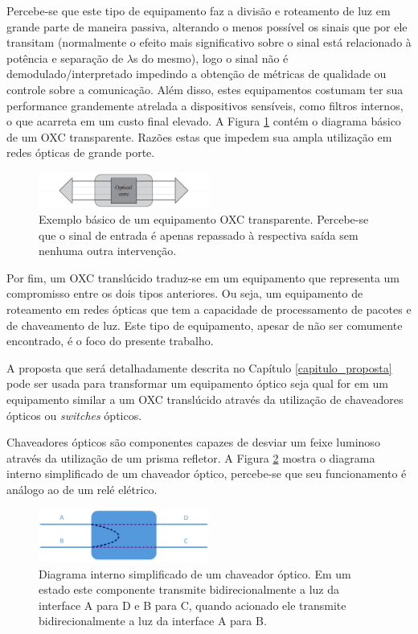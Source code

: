 Percebe-se que este tipo de equipamento faz a divisão e roteamento de luz em grande parte de maneira passiva, alterando o menos possível os sinais que por ele transitam (normalmente o efeito mais significativo sobre o sinal está relacionado à potência e separação de $\lambda$s do mesmo), logo o sinal não é demodulado/interpretado impedindo a obtenção de métricas de qualidade ou controle sobre a comunicação. Além disso, estes equipamentos costumam ter sua performance grandemente atrelada a dispositivos sensíveis, como filtros internos, o que acarreta em um custo final elevado. A Figura \ref{fig_oxc_optico} contém o diagrama básico de um OXC transparente. Razões estas que impedem sua ampla utilização em redes ópticas de grande porte.

\begin{figure}[!htb]
	\centering
	\includegraphics[width=0.5\textwidth]{./figuras/OXC-Optico.png} %
	\caption[Exemplo básico de OXC óptico]{Exemplo básico de um equipamento OXC transparente. Percebe-se que o sinal de entrada é apenas repassado à respectiva saída sem nenhuma outra intervenção.}
	\label{fig_oxc_optico}
\end{figure}

Por fim, um OXC translúcido traduz-se em um equipamento que representa um compromisso entre os dois tipos anteriores. Ou seja, um equipamento de roteamento em redes ópticas que tem a capacidade de processamento de pacotes e de chaveamento de luz. Este tipo de equipamento, apesar de não ser comumente encontrado, é o foco do presente trabalho.

A proposta que será detalhadamente descrita no Capítulo \ref{capitulo_proposta} pode ser usada para transformar um equipamento óptico seja qual for em um equipamento similar a um OXC translúcido através da utilização de chaveadores ópticos ou \emph{switches} ópticos.

Chaveadores ópticos são componentes capazes de desviar um feixe luminoso através da utilização de um prisma refletor. A Figura \ref{fig_chaveador_optico} mostra o diagrama interno simplificado de um chaveador óptico, percebe-se que seu funcionamento é análogo ao de um relé elétrico.

\begin{figure}[!htb]
	\centering
	\includegraphics[width=0.5\textwidth]{./figuras/Switch_optico.jpg} %
	\caption[Exemplo básico chaveador óptico]{Diagrama interno simplificado de um chaveador óptico. Em um estado este componente transmite bidirecionalmente a luz da interface A para D e B para C, quando acionado ele transmite bidirecionalmente a luz da interface A para B.}
	\label{fig_chaveador_optico}
\end{figure}

